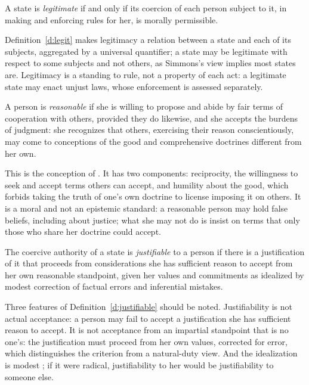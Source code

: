\documentclass{situationist-preprint}
\begin{document}
\begin{definition}[Legitimacy]\label{d:legit}
A state is \emph{legitimate} if and only if its coercion of each person subject to it, in making and enforcing rules for her, is morally permissible.
\end{definition}

Definition~\ref{d:legit} makes legitimacy a relation between a state and each of its subjects, aggregated by a universal quantifier; a state may be legitimate with respect to some subjects and not others, as Simmons's view implies most states are. Legitimacy is a standing to rule, not a property of each act: a legitimate state may enact unjust laws, whose enforcement is assessed separately.

\begin{definition}\label{d:reasonable}
A person is \emph{reasonable} if she is willing to propose and abide by fair terms of cooperation with others, provided they do likewise, and she accepts the burdens of judgment: she recognizes that others, exercising their reason conscientiously, may come to conceptions of the good and comprehensive doctrines different from her own.
\end{definition}

This is the conception of \citet[II.1--2]{Rawls1993}. It has two components: reciprocity, the willingness to seek and accept terms others can accept, and humility about the good, which forbids taking the truth of one's own doctrine to license imposing it on others. It is a moral and not an epistemic standard: a reasonable person may hold false beliefs, including about justice; what she may not do is insist on terms that only those who share her doctrine could accept.

\begin{definition}[Justifiability]\label{d:justifiable}
The coercive authority of a state is \emph{justifiable} to a person if there is a justification of it that proceeds from considerations she has sufficient reason to accept from her own reasonable standpoint, given her values and commitments as idealized by modest correction of factual errors and inferential mistakes.
\end{definition}

Three features of Definition~\ref{d:justifiable} should be noted. Justifiability is not actual acceptance: a person may fail to accept a justification she has sufficient reason to accept. It is not acceptance from an impartial standpoint that is no one's: the justification must proceed from her own values, corrected for error, which distinguishes the criterion from a natural-duty view. And the idealization is modest \citep[ch.~5]{Gaus2011}; if it were radical, justifiability to her would be justifiability to someone else.
\end{document}
